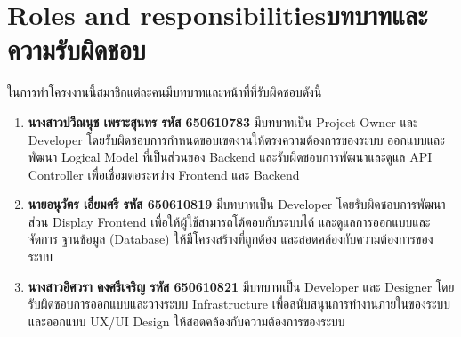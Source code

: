 \section{\ifenglish Roles and responsibilities\else บทบาทและความรับผิดชอบ\fi}
\begin{mypara}
    \indent ในการทำโครงงานนี้สมาชิกแต่ละคนมีบทบาทและหน้าที่ที่รับผิดชอบดังนี้
\end{mypara}
\begin{enumerate}
    \item \textbf{นางสาวปวีณนุช เพราะสุนทร รหัส 650610783} มีบทบาทเป็น Project Owner และ Developer 
    โดยรับผิดชอบการกำหนดขอบเขตงานให้ตรงความต้องการของระบบ ออกแบบและพัฒนา Logical Model ที่เป็นส่วนของ Backend 
    และรับผิดชอบการพัฒนาและดูแล API Controller เพื่อเชื่อมต่อระหว่าง Frontend และ Backend
    \item \textbf{นายอนุวัตร เอี่ยมศรี รหัส 650610819} มีบทบาทเป็น Developer โดยรับผิดชอบการพัฒนาส่วน Display Frontend เพื่อให้ผู้ใช้สามารถโต้ตอบกับระบบได้ และดูแลการออกแบบและจัดการ 
    ฐานข้อมูล (Database) ให้มีโครงสร้างที่ถูกต้อง และสอดคล้องกับความต้องการของระบบ
    \item \textbf{นางสาวอิศวรา คงศรีเจริญ รหัส 650610821} มีบทบาทเป็น Developer และ Designer โดยรับผิดชอบการออกแบบและวางระบบ Infrastructure เพื่อสนับสนุนการทำงานภายในของระบบ 
    และออกแบบ UX/UI Design ให้สอดคล้องกับความต้องการของระบบ 
\end{enumerate}
